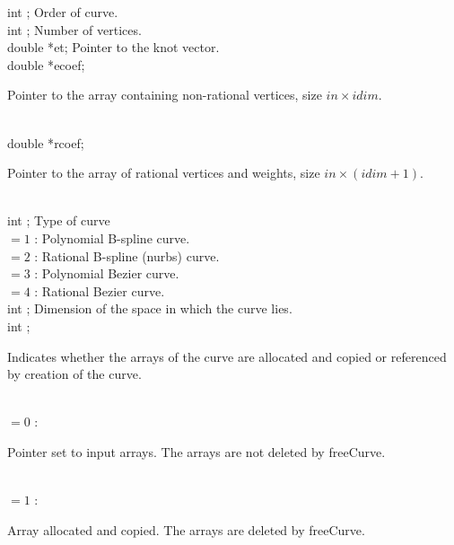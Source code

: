  \>int         ;     \>\>Order of curve. \\
  \>int         ;     \>\>Number of vertices. \\
  \>double      \>*{\fov et};    \>\>Pointer to the knot vector.  \\
  \>double      \>*{\fov ecoef}; \>\> \begin{minipg2}
                         Pointer to the array containing
                         non-rational vertices, size $in\times idim$.
                                      \end{minipg2}\\[0.8ex]
 \>double       \>*{\fov rcoef}; \>\> \begin{minipg2}
                         Pointer to the array of rational
                         vertices and weights, size $in\times (idim+1)$.
                                      \end{minipg2}\\[0.8ex]
 \>int  ;  \>\>Type of curve\\
        \>\>\>\>\>     $= 1$ :\> Polynomial B-spline curve.\\
        \>\>\>\>\>     $= 2$ :\> Rational B-spline (nurbs) curve.\\
        \>\>\>\>\>     $= 3$ :\> Polynomial Bezier curve.\\
        \>\>\>\>\>     $= 4$ :\> Rational Bezier curve.\\
  \>int         ;   \>\>Dimension of the space in which the
                                        curve lies.  \\
  \>int         ;  \>\> \begin{minipg2}
                        Indicates whether the arrays of the curve are
                       allocated and copied or referenced by creation of the curve.
                                \end{minipg2}\\[0.3ex]
        \>\>\>\>\>     $= 0$ :\>        \begin{minipg5}
                                 Pointer set to input arrays. The
                                arrays are not deleted by freeCurve.
                                        \end{minipg5}\\[0.3ex]
        \>\>\>\>\>     $= 1$ :\>        \begin{minipg5}
                                Array allocated and copied. The
                                arrays are deleted by freeCurve.
                                        \end{minipg5}\\[0.3ex]
